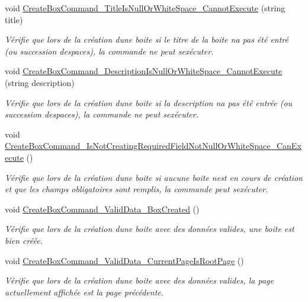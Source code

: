 \begin{DoxyCompactItemize}
void \hyperlink{class_boxes_1_1_tests_1_1_create_box_view_model_tests_a998314a0b3b974ba384c1e6cb8c536de}{Create\+Box\+Command\+\_\+\+Title\+Is\+Null\+Or\+White\+Space\+\_\+\+Cannot\+Execute} (string title)
\begin{DoxyCompactList}\small\item\em Vérifie que lors de la création d\textquotesingle{}une boite si le titre de la boite n\textquotesingle{}a pas été entré (ou succession d\textquotesingle{}espaces), la commande ne peut s\textquotesingle{}exécuter. \end{DoxyCompactList}\item 
void \hyperlink{class_boxes_1_1_tests_1_1_create_box_view_model_tests_a3d62071f0ab2476369f7c4687dd1fdb0}{Create\+Box\+Command\+\_\+\+Description\+Is\+Null\+Or\+White\+Space\+\_\+\+Cannot\+Execute} (string description)
\begin{DoxyCompactList}\small\item\em Vérifie que lors de la création d\textquotesingle{}une boite si la description n\textquotesingle{}a pas été entrée (ou succession d\textquotesingle{}espaces), la commande ne peut s\textquotesingle{}exécuter. \end{DoxyCompactList}\item 
void \hyperlink{class_boxes_1_1_tests_1_1_create_box_view_model_tests_af03bc34daefe0005029c4827a8cb827e}{Create\+Box\+Command\+\_\+\+Is\+Not\+Creating\+Required\+Field\+Not\+Null\+Or\+White\+Space\+\_\+\+Can\+Execute} ()
\begin{DoxyCompactList}\small\item\em Vérifie que lors de la création d\textquotesingle{}une boite si aucune boite n\textquotesingle{}est en cours de création et que les champs obligatoires sont remplis, la commande peut s\textquotesingle{}exécuter. \end{DoxyCompactList}\item 
void \hyperlink{class_boxes_1_1_tests_1_1_create_box_view_model_tests_a837e50015e6f0c2cb3d0965f874f636c}{Create\+Box\+Command\+\_\+\+Valid\+Data\+\_\+\+Box\+Created} ()
\begin{DoxyCompactList}\small\item\em Vérifie que lors de la création d\textquotesingle{}une boite avec des données valides, une boite est bien créée. \end{DoxyCompactList}\item 
void \hyperlink{class_boxes_1_1_tests_1_1_create_box_view_model_tests_a47ed39e4e759655a5be4cb5b4d432a04}{Create\+Box\+Command\+\_\+\+Valid\+Data\+\_\+\+Current\+Page\+Is\+Root\+Page} ()
\begin{DoxyCompactList}\small\item\em Vérifie que lors de la création d\textquotesingle{}une boite avec des données valides, la page actuellement affichée est la page précédente. \end{DoxyCompactList}\end{DoxyCompactItemize}
